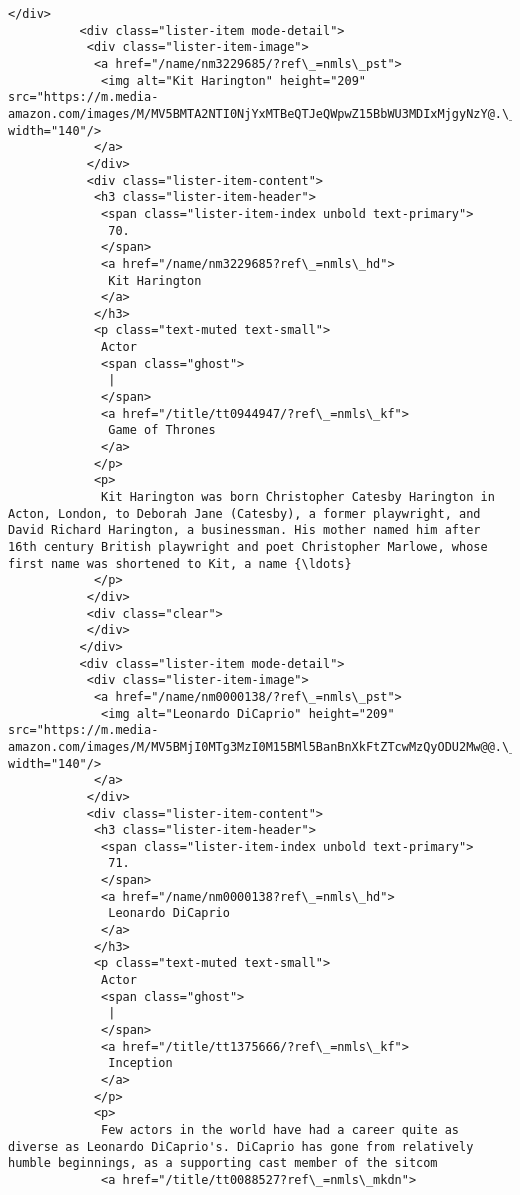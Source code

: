 \documentclass[11pt]{article}
\begin{document}
\begin{Verbatim}[commandchars=\\\{\}]
          </div>
          <div class="lister-item mode-detail">
           <div class="lister-item-image">
            <a href="/name/nm3229685/?ref\_=nmls\_pst">
             <img alt="Kit Harington" height="209" src="https://m.media-amazon.com/images/M/MV5BMTA2NTI0NjYxMTBeQTJeQWpwZ15BbWU3MDIxMjgyNzY@.\_V1\_UX140\_CR0,0,140,209\_AL\_.jpg" width="140"/>
            </a>
           </div>
           <div class="lister-item-content">
            <h3 class="lister-item-header">
             <span class="lister-item-index unbold text-primary">
              70.
             </span>
             <a href="/name/nm3229685?ref\_=nmls\_hd">
              Kit Harington
             </a>
            </h3>
            <p class="text-muted text-small">
             Actor
             <span class="ghost">
              |
             </span>
             <a href="/title/tt0944947/?ref\_=nmls\_kf">
              Game of Thrones
             </a>
            </p>
            <p>
             Kit Harington was born Christopher Catesby Harington in Acton, London, to Deborah Jane (Catesby), a former playwright, and David Richard Harington, a businessman. His mother named him after 16th century British playwright and poet Christopher Marlowe, whose first name was shortened to Kit, a name {\ldots}
            </p>
           </div>
           <div class="clear">
           </div>
          </div>
          <div class="lister-item mode-detail">
           <div class="lister-item-image">
            <a href="/name/nm0000138/?ref\_=nmls\_pst">
             <img alt="Leonardo DiCaprio" height="209" src="https://m.media-amazon.com/images/M/MV5BMjI0MTg3MzI0M15BMl5BanBnXkFtZTcwMzQyODU2Mw@@.\_V1\_UY209\_CR7,0,140,209\_AL\_.jpg" width="140"/>
            </a>
           </div>
           <div class="lister-item-content">
            <h3 class="lister-item-header">
             <span class="lister-item-index unbold text-primary">
              71.
             </span>
             <a href="/name/nm0000138?ref\_=nmls\_hd">
              Leonardo DiCaprio
             </a>
            </h3>
            <p class="text-muted text-small">
             Actor
             <span class="ghost">
              |
             </span>
             <a href="/title/tt1375666/?ref\_=nmls\_kf">
              Inception
             </a>
            </p>
            <p>
             Few actors in the world have had a career quite as diverse as Leonardo DiCaprio's. DiCaprio has gone from relatively humble beginnings, as a supporting cast member of the sitcom
             <a href="/title/tt0088527?ref\_=nmls\_mkdn">

\end{Verbatim}
\end{document}
